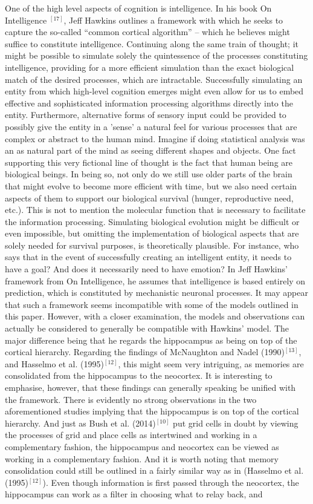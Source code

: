 One of the high level aspects of cognition is intelligence. In his book On Intelligence $^{[17]}$, Jeff Hawkins outlines a framework with which he seeks to capture the so-called “common cortical algorithm” – which he believes might suffice to constitute intelligence. Continuing along the same train of thought; it might be possible to simulate solely the quintessence of the processes constituting intelligence, providing for a more efficient simulation than the exact biological match of the desired processes, which are intractable. Successfully simulating an entity from which high-level cognition emerges might even allow for us to embed effective and sophisticated information processing algorithms directly into the entity. Furthermore, alternative forms of sensory input could be provided to possibly give the entity in a 'sense' a natural feel for various processes that are complex or abstract to the human mind. Imagine if doing statistical analysis was an as natural part of the mind as seeing different shapes and objects. One fact supporting this very fictional line of thought is the fact that human being are biological beings. In being so, not only do we still use older parts of the brain that might evolve to become more efficient with time, but we also need certain aspects of them to support our biological survival (hunger, reproductive need, etc.). This is not to mention the molecular function that is necessary to facilitate the information processing. Simulating biological evolution might be difficult or even impossible, but omitting the implementation of biological aspects that are solely needed for survival purposes, is theoretically plausible. For instance, who says that in the event of successfully creating an intelligent entity, it needs to have a goal? And does it necessarily need to have emotion? In Jeff Hawkins’ framework from On Intelligence, he assumes that intelligence is based entirely on prediction, which is constituted by mechanistic neuronal processes. It may appear that such a framework seems incompatible with some of the models outlined in this paper. However, with a closer examination, the models and observations can actually be considered to generally be compatible with Hawkins’ model. The major difference being that he regards the hippocampus as being on top of the cortical hierarchy. Regarding the findings of McNaughton and Nadel (1990)$^{[13]}$, and Hasselmo et al. (1995)$^{[12]}$, this might seem very intriguing, as memories are consolidated from the hippocampus to the neocortex. It is interesting to emphasise, however, that these findings can generally speaking be unified with the framework. There is evidently no strong observations in the two aforementioned studies implying that the hippocampus is on top of the cortical hierarchy. And just as Bush et al. (2014)$^{[10]}$ put grid cells in doubt by viewing the processes of grid and place cells as intertwined and working in a complementary fashion, the hippocampus and neocortex can be viewed as working in a complementary fashion. And it is worth noting that memory consolidation could still be outlined in a fairly similar way as in (Hasselmo et al. (1995)$^{[12]}$). Even though information is first passed through the neocortex, the hippocampus can work as a filter in choosing what to relay back, and 